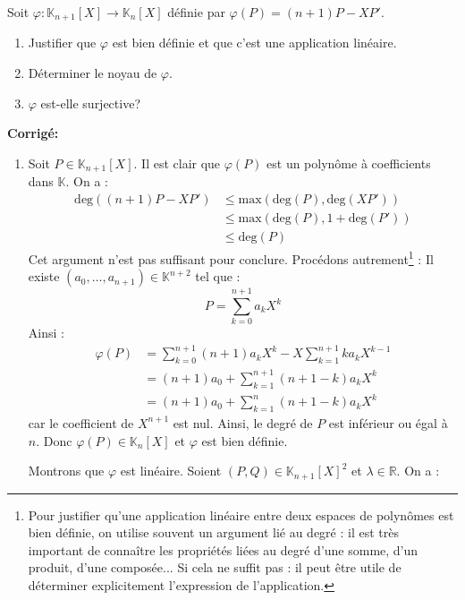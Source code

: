 \documentclass[a4paper,twoside,french,11pt]{VcCours}
\newcommand{\corr}{\textbf{Corrigé:}}
\begin{document}
\begin{Exercice}{} Soit $\varphi : \mathbb{K}_{n+1}[X]\rightarrow \mathbb{K}_{n}[X]$ définie par $\varphi(P) = (n + 1)P - XP'$.
    \begin{enumerate}
      \item
        Justifier que $\varphi$ est bien définie et que c'est une application linéaire.
      \item
        Déterminer le noyau de $\varphi$.
      \item
        $\varphi$ est-elle surjective?
    \end{enumerate}
\end{Exercice}

\corr \begin{enumerate}
\item Soit $P \in \mathbb{K}_{n+1}[X]$. Il est clair que $\varphi(P)$ est un polynôme à coefficients dans $\mathbb{K}$. On a :
\begin{align*}
\textrm{deg}((n+1)P -XP') & \leq  \textrm{max}(\textrm{deg}(P), \textrm{deg}(XP')) \\
& \leq  \textrm{max}(\textrm{deg}(P), 1 +\textrm{deg}(P') ) \\
 &\leq  \textrm{deg}(P) 
\end{align*}
Cet argument n'est pas suffisant pour conclure. Procédons autrement\footnote{Pour justifier qu'une application linéaire entre deux espaces de polynômes est bien définie, on utilise souvent un argument lié au degré : il est très important de connaître les propriétés liées au degré d'une somme, d'un produit, d'une composée... Si cela ne suffit pas : il peut être utile de déterminer explicitement l'expression de l'application.} : Il existe $(a_0, \ldots, a_{n+1}) \in \mathbb{K}^{n+2}$ tel que :
$$ P = \sum_{k=0}^{n+1} a_k X^k $$
Ainsi :
\begin{align*}
\varphi(P) & = \sum_{k=0}^{n+1} (n+1) a_k X^k - X \sum_{k=1}^{n+1} k a_k X^{k-1}  \\
& = (n+1)a_0  + \sum_{k=1}^{n+1} (n+1-k)a_k X^k  \\
& = (n+1)a_0 + \sum_{k=1}^{n} (n+1-k)a_k X^k  
\end{align*} 
car le coefficient de $X^{n+1}$ est nul. Ainsi, le degré de $P$ est inférieur ou égal à $n$. Donc $\varphi(P) \in \mathbb{K}_n[X]$ et $\varphi$ est bien définie.



\noindent Montrons que $\varphi$ est linéaire. Soient $(P,Q) \in \mathbb{K}_{n+1}[X]^2$ et $\lambda \in \mathbb{R}$. On a :


\end{enumerate}
\end{document}
